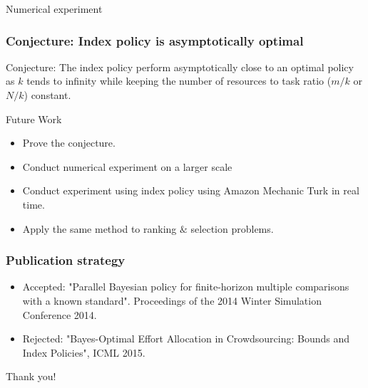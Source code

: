 \documentclass{beamer}
\begin{document}
\begin{frame}{Numerical experiment}

\end{frame}

\begin{frame}
\frametitle{Conjecture: Index policy is asymptotically optimal}
Conjecture: The index policy perform asymptotically close to an optimal policy as $k$ tends to infinity while keeping the number of resources to task ratio ($m/k$ or $N/k$) constant.
\end{frame}

\begin{frame}{Future Work}
\begin{itemize}
\item Prove the conjecture.
\item Conduct numerical experiment on a larger scale
\item Conduct experiment using index policy using Amazon Mechanic Turk in real time.
\item Apply the same method to ranking $\&$ selection problems.
\end{itemize}
\end{frame}

\begin{frame}
\frametitle{Publication strategy}
\begin{itemize}
\item Accepted: "Parallel Bayesian policy for finite-horizon
multiple comparisons with a known standard". Proceedings of the 2014 Winter Simulation Conference 2014.
\item Rejected: "Bayes-Optimal Effort Allocation in Crowdsourcing: Bounds and Index Policies", ICML 2015.
\end{itemize}
\end{frame}

\begin{frame}
\centering
{\Huge Thank you!}
\end{frame}
\end{document}
